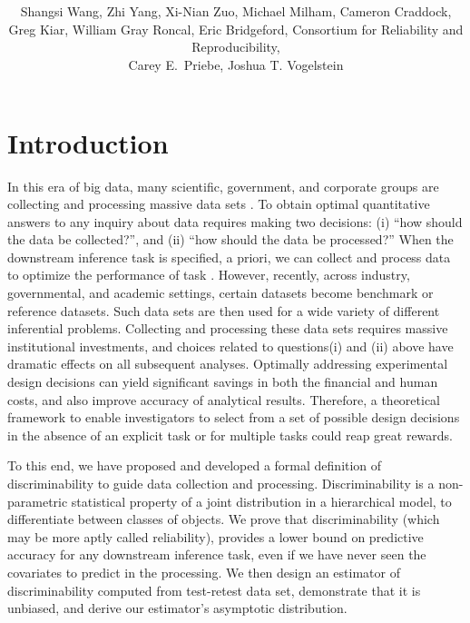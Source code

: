 \documentclass{article}
\title{\vspace{-50pt}
\db{Optimal Design for Discovery Science via Maximizing Discriminability: \\ Applications in Neuroimaging}
}
\author{Shangsi Wang, Zhi Yang, Xi-Nian Zuo, Michael Milham, Cameron Craddock,  \\ 
Greg Kiar, William Gray Roncal, Eric Bridgeford,
Consortium for Reliability and Reproducibility, \\ Carey E.~Priebe, Joshua T. Vogelstein}
\begin{document}
\maketitle
\tableofcontents
\newpage
\linenumbers

\section{Introduction}

In this era of big data, many scientific, government, and corporate groups are collecting and processing massive data sets \cite{manyika2011big}\cite{wu2014data}. To obtain optimal quantitative answers to any inquiry about data requires making two decisions: (i) “how should the data be collected?”, and (ii) “how should the data be processed?”  When the downstream inference task is specified, a priori, we can collect and process data to optimize the performance of task \cite{kohavi1995study}\cite{reiter2011mprophet}. However, recently, across industry, governmental, and academic settings, certain datasets become benchmark or reference datasets. Such data sets are then used for a wide variety of different inferential problems. Collecting and processing these data sets requires massive institutional investments, and choices related to questions(i) and (ii) above have dramatic effects on all subsequent analyses. Optimally addressing experimental design decisions can yield significant savings in both the financial and human costs, and also improve accuracy of analytical results\cite{ballou1985modeling}\cite{dale1999optimal}\cite{banga2008parameter}. Therefore, a theoretical framework to enable investigators to select from a set of possible design decisions in the absence of an explicit task or for multiple tasks could reap great rewards.

 
To this end, we have proposed and developed a formal definition of discriminability to guide data collection and processing. Discriminability is a non-parametric statistical property of a joint distribution in a hierarchical model, to differentiate between classes of objects. We prove that discriminability (which may be more aptly called reliability), provides a lower bound on predictive accuracy for any downstream inference task, even if we have never seen the covariates to predict in the processing. We then design an estimator of discriminability computed from test-retest data set, demonstrate that it is unbiased, and derive our estimator’s asymptotic distribution. 
\end{document}
